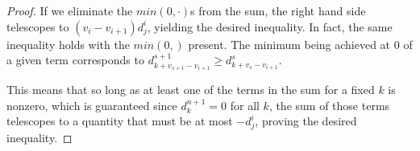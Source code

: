 \documentclass[10pt,a4paper]{amsart}
\begin{document}
\begin{proof}
If we eliminate the $min(0,\cdot)$s from the sum, the right hand side telescopes to $(v_i-v_{i+1})d^i_j$, yielding the desired inequality. In fact, the same inequality holds with the $min(0,)$ present. The minimum being achieved at $0$ of a given term corresponds to $d^{s+1}_{k+v_{s+1}-v_{i+1}}\geq d^{s}_{k+v_s-v_{i+1}}$. 

This means that so long as at least one of the terms in the sum for a fixed $k$ is nonzero, which is guaranteed since $d^{n+1}_k=0$ for all $k$, the sum of those terms telescopes to a quantity that must be at most $-d^i_j$, proving the desired inequality. 



































\end{proof}
\end{document}
